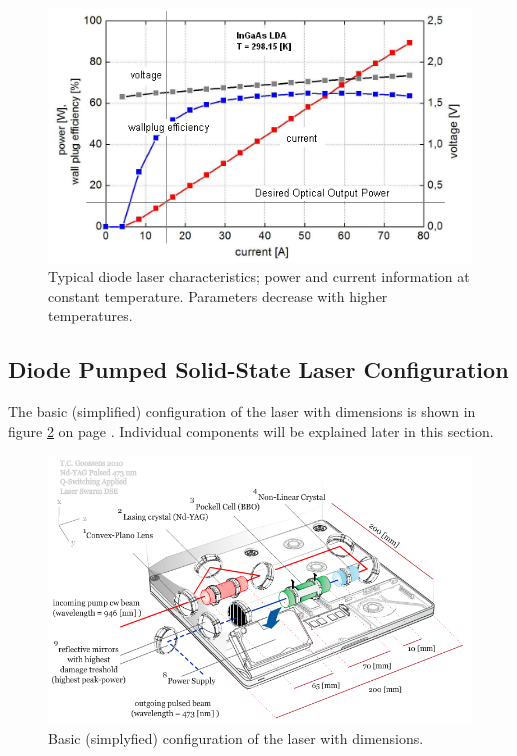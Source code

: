 \begin{figure} [ht]
\centering
\includegraphics[scale=0.5]{chapters/img/laser_power.png}	
\caption{Typical diode \acs{laser} characteristics; power and current information at constant temperature. Parameters decrease with higher temperatures.}
\label{diode_laser_char}
\end{figure}

\subsection{Diode Pumped Solid-State Laser Configuration} 
\label{laserconfig}

The basic (simplified) configuration of the \acs{laser} with dimensions is shown in figure \ref{laser_dimension} on page \pageref{laser_dimension}. Individual components will be explained later in this section.

\begin{figure} [ht]
\centering
\includegraphics[scale=0.5]{chapters/img/laserconfig.png}	
\caption{Basic (simplyfied) configuration of the \acs{laser} with dimensions.}
\label{laser_dimension}
\end{figure}

